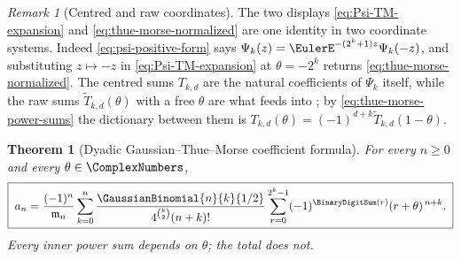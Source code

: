 \documentclass[11pt,a4paper,oneside,openany]{book}
\newtheorem{theorem}{Theorem}[chapter]
\theoremstyle{definition}
\theoremstyle{remark}
\newtheorem{remark}[remark]{Remark}
\begin{document}
\begin{remark}[Centred and raw coordinates]\label{rem:psi-two-coordinates}
The two displays \eqref{eq:Psi-TM-expansion} and \eqref{eq:thue-morse-normalized} are one
identity in two coordinate systems.  Indeed \eqref{eq:psi-positive-form} says
$\Psi_k(z)=\EulerE^{-(2^k+1)z}\Psi_k(-z)$, and substituting $z\mapsto-z$ in
\eqref{eq:Psi-TM-expansion} at $\theta=-2^k$ returns \eqref{eq:thue-morse-normalized}.
The centred sums $T_{k,d}$ are the natural coefficients of $\Psi_k$ itself, while the raw
sums $\widetilde T_{k,d}(\theta)$ with a free $\theta$ are what
 feeds into ; by
\eqref{eq:thue-morse-power-sums} the dictionary between them is
$T_{k,d}(\theta)=(-1)^{d+k}\widetilde T_{k,d}(1-\theta)$.
\end{remark}

\begin{theorem}[Dyadic Gaussian--Thue--Morse coefficient formula]\label{thm:dyadic-gaussian-thue-morse}
For every $n\ge0$ and every $\theta\in\ComplexNumbers$,
\begin{equation}\label{eq:dyadic-gaussian-thue-morse}
 \boxed{\;
 a_n=\frac{(-1)^n}{\mathfrak m_n}
 \sum_{k=0}^{n}
 \frac{\GaussianBinomial{n}{k}{1/2}}{4^{\binom k2}(n+k)!}
 \sum_{r=0}^{2^k-1}(-1)^{\BinaryDigitSum(r)}(r+\theta)^{\,n+k}.\;}
\end{equation}
Every inner power sum depends on $\theta$; the total does not.
\end{theorem}
\end{document}
